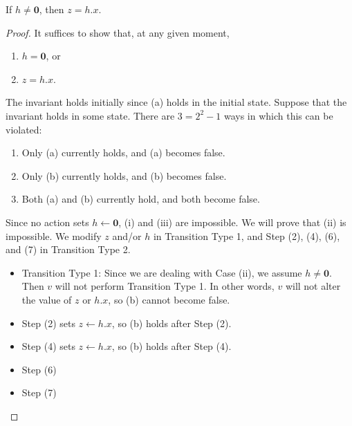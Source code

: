 \begin{thm}
    If $h \ne \textbf{0}$, then $z = h.x$.
\end{thm}

\begin{proof}
    It suffices to show that, at any given moment,
    \begin{enumerate}[label=(\alph*)]
        \item %
            $h = \textbf{0}$, or
        \item %
            $z = h.x$.
    \end{enumerate}
    The invariant holds initially since (a) holds in the initial state.
    Suppose that the invariant holds in some state.
    There are $3 = 2^2 - 1$ ways in which this can be violated:
    \begin{enumerate}[label=(\roman*)]
        \item  %
            Only (a) currently holds, and (a) becomes false.
        \item  %
            Only (b) currently holds, and (b) becomes false.
        \item  %
            Both (a) and (b) currently hold, and both become false.
    \end{enumerate}
    Since no action sets $h \leftarrow \textbf{0}$, (i) and (iii) are impossible.
    We will prove that (ii) is impossible.
    We modify $z$ and/or $h$ in Transition Type 1, and Step (2), (4), (6), and (7) in Transition Type 2.
    \begin{itemize}
        \item
            Transition Type 1: Since we are dealing with Case (ii), we assume $h \ne \textbf{0}$.
            Then $v$ will not perform Transition Type 1.
            In other words, $v$ will not alter the value of $z$ or $h.x$, so (b) cannot become false.
        \item
            Step (2) sets $z \leftarrow h.x$, so (b) holds after Step (2).
        \item
            Step (4) sets $z \leftarrow h.x$, so (b) holds after Step (4).
        \item
            Step (6)
        \item
            Step (7)
    \end{itemize}
\end{proof}

